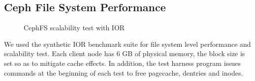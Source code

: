 \subsection{Ceph File System Performance}
\label{sec:ior-initial}

\begin{figure}[!t]

\centerline{
\hfil
{}
}%
\caption{CephFS scalability test with IOR}

\end{figure}


We used the synthetic IOR benchmark
suite\cite{ior} for file system
level performance and scalability test.  
Each client node has 6 GB of physical memory, the block
size is set so as to mitigate cache effects. In addition, the test harness
program issues commands at the beginning of each test to free pagecache,
dentries and inodes.

